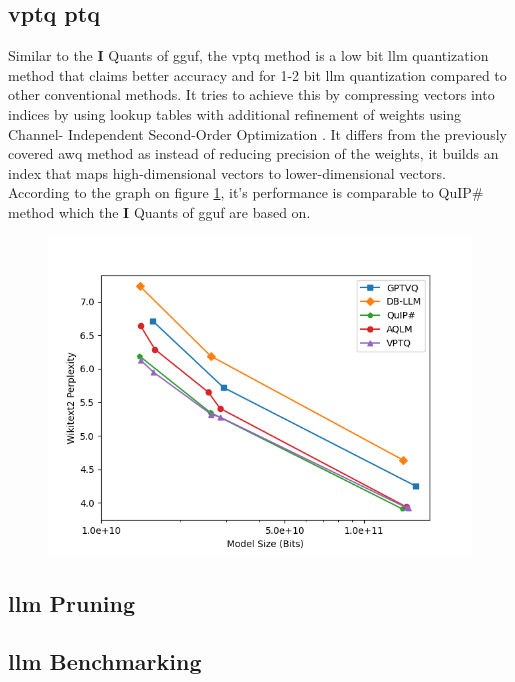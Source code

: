 \documentclass{ifacconf}
\begin{document}
	\subsection{\gls{vptq} \gls{ptq}}
	
	Similar to the \textbf{I} Quants of \gls{gguf}, the \gls{vptq} method is a low bit \gls{llm} quantization method that claims better accuracy and for 1-2 bit \gls{llm} quantization compared to other conventional methods. It tries to achieve this by compressing vectors into indices by using lookup tables with additional refinement of weights using Channel-
	Independent Second-Order Optimization \cite{liu2024vptqextremelowbitvector}. It differs from the previously covered \gls{awq} method as instead of reducing precision of the weights, it builds an index that maps high-dimensional vectors to lower-dimensional vectors. According to the graph on figure \ref{fig:vptq}, it's performance is comparable to QuIP\# method which the \textbf{I} Quants of \gls{gguf} are based on.
	
	\begin{figure}[h]
		\includegraphics[width=1.1\linewidth]{vptq}
		\label{fig:vptq}
	\end{figure}
	
	\subsection{\gls{llm} Pruning}
	
	\subsection{\gls{llm} Benchmarking}
	
\end{document}
